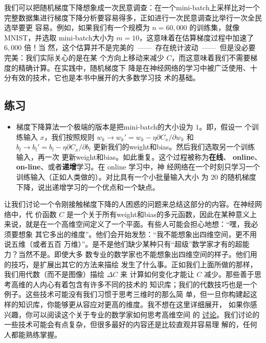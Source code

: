 我们可以把随机梯度下降想象成一次民意调查：在一个\gls*{mini-batch}上采样比对一个
完整数据集进行梯度下降分析要容易得多，正如进行一次民意调查比举行一次全民选举要更
容易。例如，如果我们有一个规模为 $n = 60,000$ 的训练集，就像 MNIST，并选取
\gls*{mini-batch}大小为 $m = 10$，这意味着在估算梯度过程中加速了 $6,000$ 倍！当
然，这个估算并不是完美的~——~存在统计波动~——~但是没必要完美：我们实际关心的是在某
个方向上移动来减少 $C$，而这意味着我们不需要梯度的精确计算。在实践中，随机梯度下
降是在神经网络的学习中被广泛使用、十分有效的技术，它也是本书中展开的大多数学习技
术的基础。

\subsection*{练习}

\begin{itemize}
\item 梯度下降算法一个极端的版本是把\gls*{mini-batch}的大小设为 $1$。即，假设一
  个训练输入 $x$，我们按照规则 $w_k \rightarrow w_k' = w_k - \eta \partial C_x /
  \partial w_k$ 和 $b_l \rightarrow b_l' = b_l - \eta \partial C_x / \partial
  b_l$ 更新我们的\gls*{weight}和\gls*{bias}。然后我们选取另一个训练输入，再一次
  更新\gls*{weight}和\gls*{bias}。如此重复。这个过程被称为\textbf{在线}、%
  \textbf{online}、\textbf{on-line}、或者\textbf{递增}学习。在 online 学习中，神
  经网络在一个时刻只学习一个训练输入（正如人类做的）。对比具有一个小批量输入大小
  为 $20$ 的随机梯度下降，说出递增学习的一个优点和一个缺点。
\end{itemize}

让我们讨论一个令刚接触梯度下降的人困惑的问题来总结这部分的内容。在神经网络中，代
价函数 $C$ 是一个关于所有\gls*{weight}和\gls*{bias}的多元函数，因此在某种意义上
来说，就是在一个高维空间定义了一个平面。有些人可能会担心地想：“嘿，我必须要想象
其它多出的维度”。他们会开始发愁：“我不能想象出四维空间，更不用说五维（或者五百
  万维）”。是不是他们缺少某种只有“超级”数学家才有的超能力？当然不是。即使大多
数专业的数学家也不能想象出四维空间的样子。他们用的技巧，是扩展出其它的方法来描绘
发生了什么事。正如我们上面所做的那样，我们用代数（而不是图像）描绘 $\Delta C$ 来
计算如何变化才能让 $C$ 减少。那些善于思考高维的人内心有着包含有许多不同的技术的
知识库；我们的代数技巧也是一个例子。这些技术可能没有我们习惯于思考三维时的那么简
单，但一旦你构建起这样的知识库，你能够更从容应对更高的维度。我不想在这里详细展开，
如果你感兴趣，你可以阅读这个关于专业的数学家如何思考高维空间
的%
\href{http://mathoverflow.net/questions/25983/intuitive-crutches-for-higher-dimensional-thinking}{
  讨论}。我们讨论的一些技术可能会有点复杂，但很多最好的内容还是比较直观并容易理
解的，任何人都能熟练掌握。

